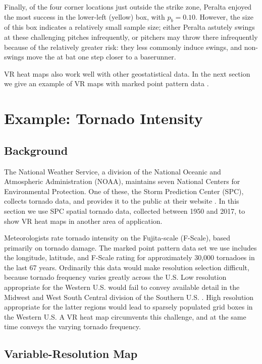 Finally, of the four corner locations just outside the strike zone, Peralta enjoyed the most success in the lower-left (yellow) box, with $p_{b} = 0.10$. However, the size of this box indicates a relatively small sample size; either Peralta astutely swings at these challenging pitches infrequently, or pitchers may throw there infrequently because of the relatively greater risk: they less commonly induce swings, and non-swings move the at bat one step closer to a baserunner. 

VR heat maps also work well with other geostatistical data. In the next section we give an example of VR maps with marked point pattern data \citep{Schabenberger2004}.

\section{Example: Tornado Intensity}

\subsection{Background}

The National Weather Service, a division of the National Oceanic and Atmospheric Administration (NOAA), maintains seven National Centers for Environmental Protection. One of these, the Storm Prediction Center (SPC), collects tornado data, and provides it to the public at their website \citep{NOAA}. In this section we use SPC spatial tornado data, collected between 1950 and 2017, to show VR heat maps in another area of application. 

Meteorologists rate tornado intensity on the Fujita-scale (F-Scale), based primarily on tornado damage. The marked point pattern data set we use includes the longitude, latitude, and F-Scale rating for approximately 30,000 tornadoes in the last 67 years. Ordinarily this data would make resolution selection difficult, because tornado frequency varies greatly across the U.S. Low resolution appropriate for the Western U.S. would fail to convey available detail in the Midwest and West South Central division of the Southern U.S. \citep{regions}. High resolution appropriate for the latter regions would lead to sparsely populated grid boxes in the Western U.S. A VR heat map circumvents this challenge, and at the same time conveys the varying tornado frequency. 

\subsection{Variable-Resolution Map}


